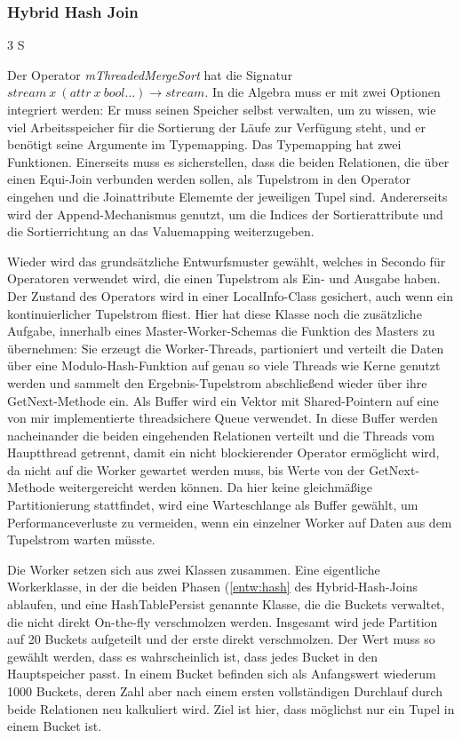 \documentclass[a4paper,12pt,twoside]{article}
\newcommand{\Fb}[1]{\textit{#1}} %
\begin{document}
\subsubsection{Hybrid Hash Join} 3 S

Der Operator \Fb{mThreadedMergeSort} hat die Signatur $stream~x~(attr~x~bool \ldots) \longrightarrow stream$. In die Algebra muss er mit zwei Optionen integriert werden: Er muss seinen Speicher selbst verwalten, um zu wissen, wie viel Arbeitsspeicher für die Sortierung der Läufe zur Verfügung steht, und er benötigt seine Argumente im Typemapping. Das Typemapping hat zwei Funktionen. Einerseits muss es sicherstellen, dass die beiden Relationen, die über einen Equi-Join verbunden werden sollen, als Tupelstrom in den Operator eingehen und die Joinattribute Elememte der jeweiligen Tupel sind. Andererseits wird der Append-Mechanismus genutzt, um die Indices der Sortierattribute und die Sortierrichtung an das Valuemapping weiterzugeben.

Wieder wird das grundsätzliche Entwurfsmuster gewählt, welches in Secondo für Operatoren verwendet wird, die einen Tupelstrom als Ein- und Ausgabe haben. Der Zustand des Operators wird in einer LocalInfo-Class gesichert, auch wenn ein kontinuierlicher Tupelstrom fliest. Hier hat diese Klasse noch die zusätzliche Aufgabe, innerhalb eines Master-Worker-Schemas die Funktion des Masters zu übernehmen: Sie erzeugt die Worker-Threads, partioniert und verteilt die Daten über eine Modulo-Hash-Funktion auf genau so viele Threads wie Kerne genutzt werden und sammelt den Ergebnis-Tupelstrom abschließend wieder über ihre GetNext-Methode ein. Als Buffer wird ein Vektor mit Shared-Pointern auf eine von mir implementierte threadsichere Queue verwendet. In diese Buffer werden nacheinander die beiden eingehenden Relationen verteilt und die Threads vom Hauptthread getrennt, damit ein nicht blockierender Operator ermöglicht wird, da nicht auf die Worker gewartet werden muss, bis Werte von der GetNext-Methode weitergereicht werden können. Da hier keine gleichmäßige Partitionierung stattfindet, wird eine Warteschlange als Buffer gewählt, um Performanceverluste zu vermeiden, wenn ein einzelner Worker auf Daten aus dem Tupelstrom warten müsste.

Die Worker setzen sich aus zwei Klassen zusammen. Eine eigentliche Workerklasse, in der die beiden Phasen (\autoref{entw:hash} des Hybrid-Hash-Joins ablaufen, und eine HashTablePersist genannte Klasse, die die Buckets verwaltet, die nicht direkt On-the-fly verschmolzen werden. Insgesamt wird jede Partition auf 20 Buckets aufgeteilt und der erste direkt verschmolzen. Der Wert muss so gewählt werden, dass es wahrscheinlich ist, dass jedes Bucket in den Hauptspeicher passt. In einem Bucket befinden sich als Anfangswert wiederum 1000 Buckets, deren Zahl aber nach einem ersten vollständigen Durchlauf durch beide Relationen neu kalkuliert wird. Ziel ist hier, dass möglichst nur ein Tupel in einem Bucket ist.
\end{document}
